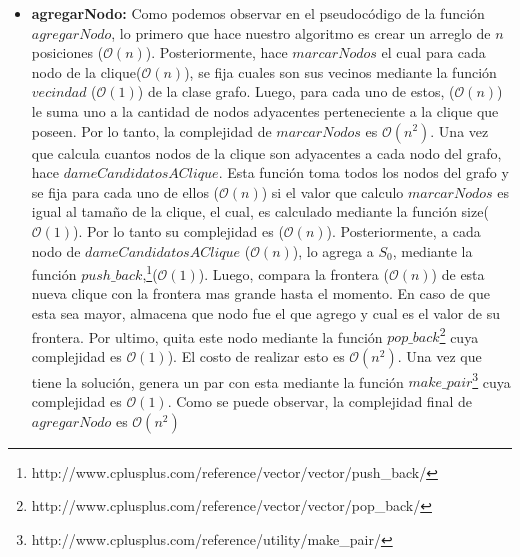 \begin{itemize}
\item \textbf{agregarNodo:} \newline 
Como podemos observar en el pseudocódigo de la función $agregarNodo$, lo primero que hace nuestro algoritmo es crear un arreglo de $n$ posiciones ($\mathcal{O}(n)$). Posteriormente, hace $marcarNodos$ el cual para cada nodo de la clique($\mathcal{O}(n)$), se fija cuales son sus vecinos mediante la función $vecindad$ ($\mathcal{O}(1)$) de la clase grafo. Luego, para cada uno de estos, ($\mathcal{O}(n)$) le suma uno a la cantidad de nodos adyacentes perteneciente a la clique que poseen. Por lo tanto, la complejidad de $marcarNodos$ es $\mathcal{O}(n^{2})$. \newline
Una vez que calcula cuantos nodos de la clique son adyacentes a cada nodo del grafo, hace $dameCandidatosAClique$. Esta función toma todos los nodos del grafo y se fija para cada uno de ellos ($\mathcal{O}(n)$) si el valor que calculo $marcarNodos$ es igual al tamaño de la clique, el cual, es calculado mediante la función size($\mathcal{O}(1)$). Por lo tanto su complejidad es ($\mathcal{O}(n)$). \newline
Posteriormente, a cada nodo de $dameCandidatosAClique$ ($\mathcal{O}(n)$), lo agrega a $S_{0}$, mediante la función $push\_back$,\footnote{http://www.cplusplus.com/reference/vector/vector/push\_back/}($\mathcal{O}(1)$). Luego, compara la frontera ($\mathcal{O}(n)$) de esta nueva clique con la frontera mas grande hasta el momento. En caso de que esta sea mayor, almacena que nodo fue el que agrego y cual es el valor de su frontera. Por ultimo, quita este nodo mediante la función $pop\_back$\footnote{http://www.cplusplus.com/reference/vector/vector/pop\_back/} cuya complejidad es $\mathcal{O}(1)$). El costo de realizar esto es $\mathcal{O}(n^{2})$. \newline
Una vez que tiene la solución, genera un par con esta mediante la función $make\_pair$\footnote{http://www.cplusplus.com/reference/utility/make\_pair/} cuya complejidad es $\mathcal{O}(1)$.
\newline
Como se puede observar, la complejidad final de $agregarNodo$ es $\mathcal{O}(n^{2})$


\end{itemize}
